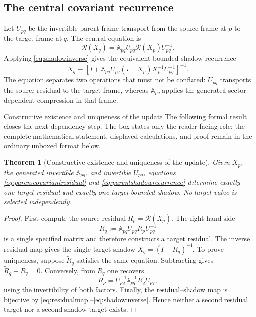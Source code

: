 \documentclass[11pt]{article}
\numberwithin{equation}{section}
\newtheorem{theorem}[definition]{Theorem}
\theoremstyle{remark}
\begin{document}
\subsection{The central covariant recurrence}
Let $U_{pq}$ be the invertible parent-frame transport from the source frame at $p$ to the target frame at $q$.  The central equation is
\begin{equation}
\boxed{\mathcal R(X_q)=\mathbb A_{pq}U_{pq}\mathcal R(X_p)U_{pq}^{-1}.}
\label{eq:parentcovariantresidual}
\end{equation}
Applying \eqref{eq:shadowinverse} gives the equivalent bounded-shadow recurrence
\begin{equation}
\boxed{X_q=\left[I+\mathbb A_{pq}U_{pq}(I-X_p)X_p^{-1}U_{pq}^{-1}\right]^{-1}.}
\label{eq:parentshadowrecurrence}
\end{equation}
The equation separates two operations that must not be conflated: $U_{pq}$ transports the source residual to the target frame, whereas $\mathbb A_{pq}$ applies the generated sector-dependent compression in that frame.

\begin{proofguide}{Constructive existence and uniqueness of the update}
The following formal result closes the next dependency step. The box states only the reader-facing role; the complete mathematical statement, displayed calculations, and proof remain in the ordinary unboxed format below.
\end{proofguide}
\begin{theorem}[Constructive existence and uniqueness of the update]
Given $X_p$, the generated invertible $\mathbb A_{pq}$, and invertible $U_{pq}$, equations \eqref{eq:parentcovariantresidual} and \eqref{eq:parentshadowrecurrence} determine exactly one target residual and exactly one target bounded shadow.  No target value is selected independently.
\end{theorem}
\begin{proof}
First compute the source residual $R_p=\mathcal R(X_p)$.  The right-hand side
\begin{equation}
R_q:=\mathbb A_{pq}U_{pq}R_pU_{pq}^{-1}
\end{equation}
is a single specified matrix and therefore constructs a target residual.  The inverse residual map gives the single target shadow $X_q=(I+R_q)^{-1}$.  To prove uniqueness, suppose $\widetilde R_q$ satisfies the same equation.  Subtracting gives $\widetilde R_q-R_q=0$.  Conversely, from $R_q$ one recovers
\begin{equation}
R_p=U_{pq}^{-1}\mathbb A_{pq}^{-1}R_qU_{pq},
\end{equation}
using the invertibility of both factors.  Finally, the residual--shadow map is bijective by \eqref{eq:residualmap}--\eqref{eq:shadowinverse}.  Hence neither a second residual target nor a second shadow target exists.
\end{proof}
\end{document}
